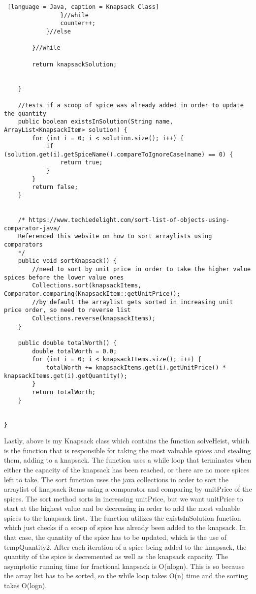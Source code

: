 \documentclass{article}
\begin{document}
\begin{lstlisting} [language = Java, caption = Knapsack Class]
                }//while
                counter++;
            }//else

        }//while

        return knapsackSolution;
        

    }

    //tests if a scoop of spice was already added in order to update the quantity
    public boolean existsInSolution(String name, ArrayList<KnapsackItem> solution) {
        for (int i = 0; i < solution.size(); i++) {
            if (solution.get(i).getSpiceName().compareToIgnoreCase(name) == 0) {
                return true;
            }
        }
        return false;
    }


    /* https://www.techiedelight.com/sort-list-of-objects-using-comparator-java/
    Referenced this website on how to sort arraylists using comparators
    */
    public void sortKnapsack() {
        //need to sort by unit price in order to take the higher value spices before the lower value ones
        Collections.sort(knapsackItems, Comparator.comparing(KnapsackItem::getUnitPrice));
        //by default the arraylist gets sorted in increasing unit price order, so need to reverse list
        Collections.reverse(knapsackItems);
    }
    
    public double totalWorth() {
        double totalWorth = 0.0;
        for (int i = 0; i < knapsackItems.size(); i++) {
            totalWorth += knapsackItems.get(i).getUnitPrice() * knapsackItems.get(i).getQuantity();
        }
        return totalWorth;
    }


}

\end{lstlisting}

\noindent Lastly, above is my Knapsack class which contains the function solveHeist, which is the function that is responsible for taking the most valuable spices and stealing them, adding to a knapsack. The function uses a while loop that terminates when either the capacity of the knapsack has been reached, or there are no more spices left to take. The sort function uses the java collections in order to sort the arraylist of knapsack items using a comparator and comparing by unitPrice of the spices. The sort method sorts in increasing unitPrice, but we want unitPrice to start at the highest value and be decreasing in order to add the most valuable spices to the knapsack first. The function utilizes the existsInSolution function which just checks if a scoop of spice has already been added to the knapsack. In that case, the quantity of the spice has to be updated, which is the use of tempQuantity2. After each iteration of a spice being added to the knapsack, the quantity of the spice is decremented as well as the knapsack capacity. The asymptotic running time for fractional knapsack is O(nlogn). This is so because the array list has to be sorted, so the while loop takes O(n) time and the sorting takes O(logn). 
\end{document}
